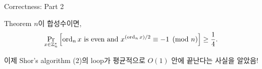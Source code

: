 \documentclass[../240513_msquare_shor.tex]{subfiles}
\begin{document}
\begin{frame}{Correctness: Part 2}
    \begin{block}{Theorem}
        \(n\)이 합성수이면,
        \[
            \Pr_{x \in \mathbb{Z}_n^\ast} \left[ \operatorname{ord}_n x~\text{is even and}~
            x^{(\operatorname{ord}_n x) / 2} \equiv -1 \pmod{n}\right] \ge \frac{1}{4}.
        \]
    \end{block}
    \begin{exampleblock}{}
        이제 Shor's algorithm (2)의 loop가
        평균적으로 \(O(1)\) 안에 끝난다는 사실을 알았음!
    \end{exampleblock}
\end{frame}
\end{document}
